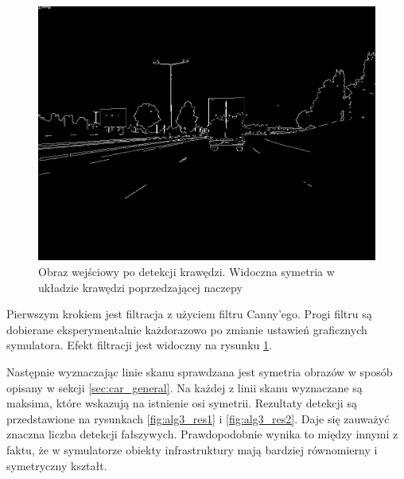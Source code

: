 \begin{figure}
  \centering
  \includegraphics[width=13cm]{img/alg3_canny.jpg}
  \caption{Obraz wejściowy po detekcji krawędzi. Widoczna symetria w układzie krawędzi poprzedzającej naczepy}
  \label{fig:alg3_canny}
\end{figure}

Pierwszym krokiem jest filtracja z użyciem filtru Canny'ego. 
Progi filtru są dobierane eksperymentalnie każdorazowo po zmianie ustawień graficznych symulatora. %
Efekt filtracji jest widoczny na rysunku \ref{fig:alg3_canny}.

Następnie wyznaczając linie skanu sprawdzana jest symetria obrazów w sposób opisany w sekcji \ref{sec:car_general}. %
Na każdej z linii skanu wyznaczane są maksima, które wskazują na istnienie osi symetrii. 
Rezultaty detekcji są przedstawione na rysunkach \ref{fig:alg3_res1} i \ref{fig:alg3_res2}. 
Daje się zauważyć znaczna liczba detekcji fałszywych. 
Prawdopodobnie wynika to między innymi z faktu, że w symulatorze obiekty infrastruktury mają bardziej równomierny i symetryczny kształt.


